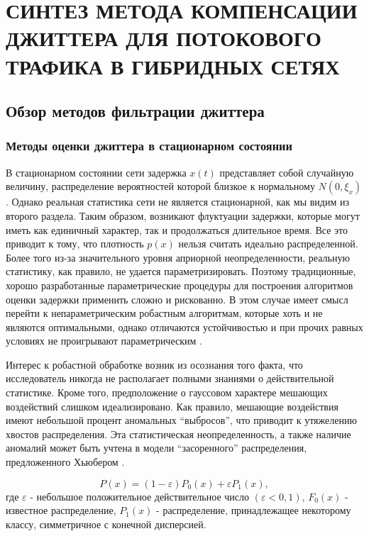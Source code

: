 \chapter{СИНТЕЗ МЕТОДА КОМПЕНСАЦИИ ДЖИТТЕРА ДЛЯ ПОТОКОВОГО ТРАФИКА В ГИБРИДНЫХ СЕТЯХ } \label{chapt:estim}

\section{Обзор методов фильтрации джиттера} \label{sect_analis_filters}
\subsection{Методы оценки джиттера в стационарном состоянии}

В стационарном состоянии сети задержка $x(t)$ представляет собой случайную величину, распределение вероятностей которой близкое к нормальному $N(0,\xi_x)$. 
Однако реальная статистика сети не является стационарной, как мы видим из второго раздела. 
Таким образом, возникают флуктуации задержки, которые могут иметь как единичный характер, так и продолжаться длительное время.
Все это приводит к тому, что плотность $p(x)$ нельзя считать идеально распределенной. 
Более того из-за значительного уровня априорной неопределенности, реальную статистику, как правило, не удается параметризировать. 
Поэтому традиционные, хорошо разработанные параметрические процедуры для построения алгоритмов оценки задержки применить сложно и рискованно. 
В этом случае имеет смысл перейти к непараметрическим робастным алгоритмам, которые хоть и не являются оптимальными, однако отличаются устойчивостью и при прочих равных условиях не проигрывают параметрическим \cite{tihonov}.

Интерес к робастной обработке возник из осознания того факта, что исследователь никогда не располагает полными знаниями о действительной статистике.
Кроме того, предположение о гауссовом характере мешающих воздействий слишком идеализировано.
Как правило, мешающие воздействия имеют небольшой процент аномальных ``выбросов'', что приводит к утяжелению хвостов распределения. 
Эта статистическая неопределенность, а также наличие аномалий может быть учтена в модели ``засоренного'' распределения, предложенного Хьюбером \cite{huber}.

\begin{equation}\label{eq3:huber}
P(x)=(1-\varepsilon)P_0(x)+\varepsilon P_1(x),
\end{equation}
\noindent где $\varepsilon$ - небольшое положительное действительное число $(\varepsilon<0,1)$, $F_0(x)$ - известное распределение, $P_1(x)$ - распределение, принадлежащее некоторому классу, симметричное с конечной дисперсией.

